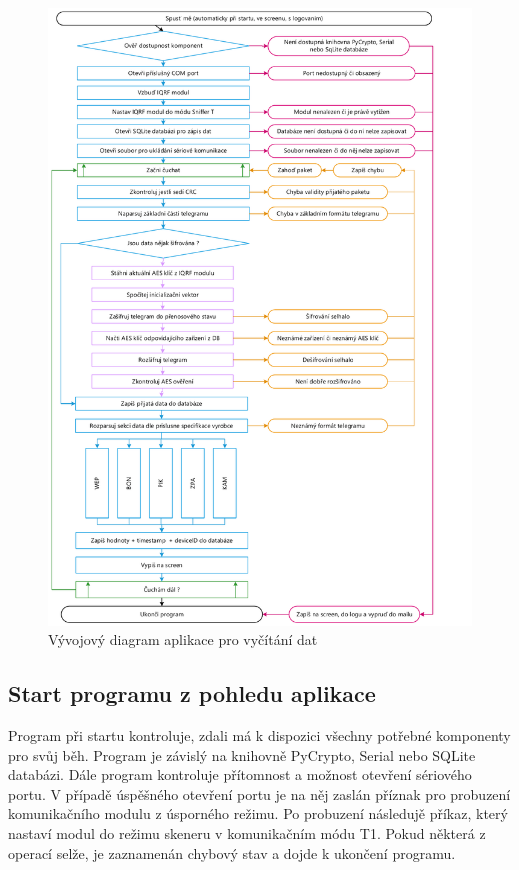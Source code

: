  \begin{figure}[!ht]
  \begin{center}
    \includegraphics[scale=0.6]{obrazky/aplikace_diagram}
  \end{center}
  \caption{Vývojový diagram aplikace pro vyčítání dat}
	\label{AplikaceDiagram}
\end{figure}

\subsection{Start programu z pohledu aplikace}
Program při startu kontroluje, zdali  má k dispozici všechny potřebné komponenty pro svůj běh. Program je závislý na knihovně PyCrypto, Serial nebo SQLite databázi.
Dále program kontroluje přítomnost a možnost otevření sériového portu. V případě úspěšného otevření portu je na něj zaslán příznak pro probuzení komunikačního modulu z úsporného režimu. Po probuzení následujě příkaz, který nastaví modul do režimu skeneru v komunikačním módu T1. Pokud některá z operací selže, je zaznamenán chybový stav a dojde k ukončení programu.

